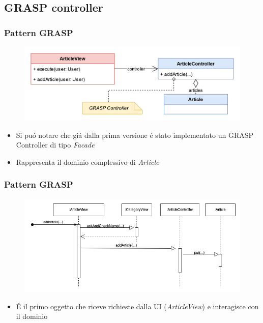 \subsection{GRASP controller}
\begin{frame}
    \frametitle{Pattern GRASP}
    \begin{figure}
        \includegraphics[width=1\textwidth]{img/MV.png}
    \end{figure}
    \begin{itemize}
        \item Si puó notare che giá dalla prima versione é stato implementato un GRASP Controller di tipo \emph{Facade}
        \item Rappresenta il dominio complessivo di \emph{Article}
    \end{itemize}
\end{frame}

\begin{frame}
    \frametitle{Pattern GRASP}
    \begin{figure}
        \includegraphics[width=1\textwidth]{img/sequenzaGraspController_before.png}
    \end{figure}
    \begin{itemize}
        \item É il primo oggetto che riceve richieste dalla UI (\emph{ArticleView}) e interagisce con il dominio
    \end{itemize}
\end{frame}

